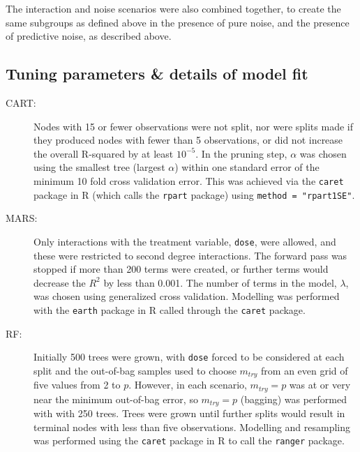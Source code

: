 \documentclass[12pt]{article}
\begin{document}
The interaction and noise scenarios were also combined together, to create the same subgroups as defined above in the presence of pure noise, and the presence of predictive noise, as described above.



\subsection{Tuning parameters \& details of model fit} %
\label{ssub:tuning_parameters_for_interaction_scenario}

\begin{description}
  \item [CART:] Nodes with 15 or fewer observations were not split, nor were splits made if they produced nodes with fewer than 5 observations, or did not increase the overall R-squared by at least $10^{-5}$.
  In the pruning step, $\alpha$ was chosen using the smallest tree (largest $\alpha$) within one standard error of the minimum 10 fold cross validation error. This was achieved via the \texttt{caret} package in \textsf{R} (which calls the \texttt{rpart} package) using \texttt{method = "rpart1SE"}.
  \item [MARS:] Only interactions with the treatment variable, \texttt{dose}, were allowed, and these were restricted to second degree interactions. The forward pass was stopped if more than 200 terms were created, or further terms would decrease the $R^2$ by less than 0.001. The number of terms in the model, $\lambda$, was chosen using generalized cross validation. Modelling was performed with the \texttt{earth} package in \textsf{R} called through the \texttt{caret} package.
  \item [RF:] Initially 500 trees were grown, with \texttt{dose} forced to be considered at each split and the out-of-bag samples used to choose $m_{try}$ from an even grid of five values from 2 to $p$. However, in each scenario, $m_{try} = p$ was at or very near the minimum out-of-bag error, so $m_{try} = p$ (bagging) was performed with with 250 trees. Trees were grown until further splits would result in terminal nodes with less than five observations. Modelling and resampling was performed using the \texttt{caret} package in \textsf{R} to call the \texttt{ranger} package.
\end{description}
\end{document}
